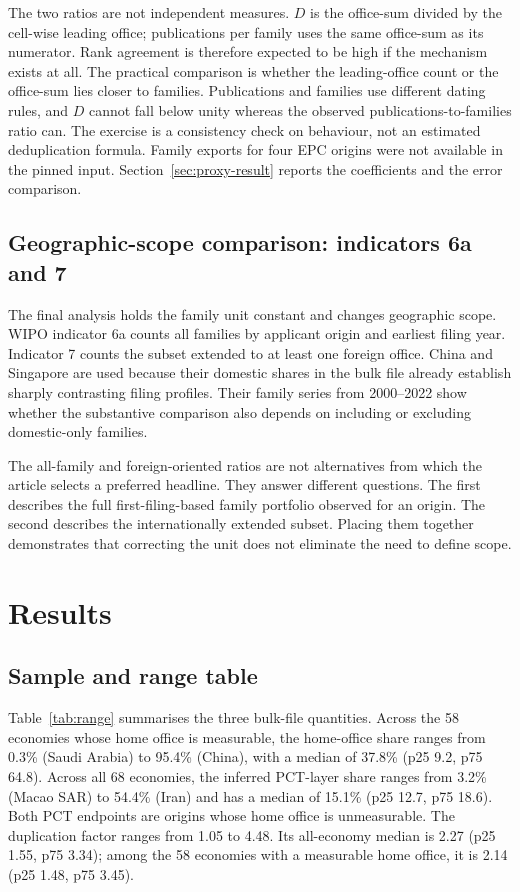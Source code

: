\documentclass[a4paper,fleqn]{cas-dc}
\begin{document}
The two ratios are not independent measures. $D$ is the office-sum divided by
the cell-wise leading office; publications per family uses the same office-sum
as its numerator. Rank agreement is therefore expected to be high if the
mechanism exists at all. The practical comparison is whether the
leading-office count or the office-sum lies closer to families. Publications
and families use different dating rules, and $D$ cannot fall below unity
whereas the observed publications-to-families ratio can. The exercise is a
consistency check on behaviour, not an estimated deduplication formula.
Family exports for four EPC origins were not available in the pinned input.
Section~\ref{sec:proxy-result} reports the coefficients and the error
comparison.

\subsection{Geographic-scope comparison: indicators 6a and 7}\label{sec:scope-method}

The final analysis holds the family unit constant and changes geographic
scope. WIPO indicator 6a counts all families by applicant origin and earliest
filing year. Indicator 7 counts the subset extended to at least one foreign
office. China and Singapore are used because their domestic shares in the
bulk file already establish sharply contrasting filing profiles. Their
family series from 2000--2022 show whether the substantive comparison also
depends on including or excluding domestic-only families.

The all-family and foreign-oriented ratios are not alternatives from which the
article selects a preferred headline. They answer different questions. The
first describes the full first-filing-based family portfolio observed for an
origin. The second describes the internationally extended subset. Placing
them together demonstrates that correcting the unit does not eliminate the
need to define scope.

\section{Results}\label{sec:results}

\subsection{Sample and range table}\label{sec:range}

Table~\ref{tab:range} summarises the three bulk-file quantities. Across the 58
economies whose home office is measurable, the home-office share ranges from
0.3\% (Saudi Arabia) to 95.4\% (China), with a median of 37.8\% (p25 9.2,
p75 64.8). Across all 68 economies, the inferred PCT-layer share ranges from
3.2\% (Macao SAR) to 54.4\% (Iran) and has a median of 15.1\% (p25 12.7,
p75 18.6). Both PCT endpoints are origins whose home office is unmeasurable.
The duplication factor ranges from 1.05 to 4.48. Its all-economy median is
2.27 (p25 1.55, p75 3.34); among the 58 economies with a measurable home
office, it is 2.14 (p25 1.48, p75 3.45).
\end{document}
